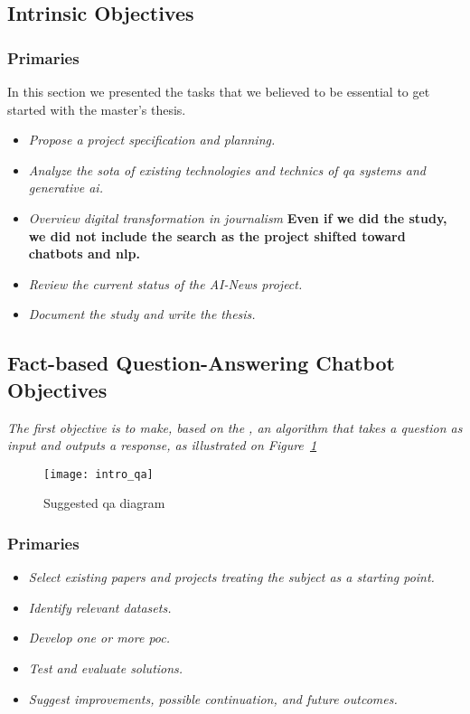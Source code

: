 \subsection{Intrinsic Objectives}
\subsubsection{Primaries}
In this section we presented the tasks that we believed to be essential to get started with the master's thesis. 

\begin{itemize}[noitemsep]
    \item[\checkmark] \textit{Propose a project specification and planning.} %
    \item[\checkmark] \textit{Analyze the \gls{sota} of existing technologies and technics of \gls{qa} systems and \gls{generative} \gls{ai}.}
    \item[\checkmark] \textit{Overview digital transformation in journalism} \textbf{Even if we did the study, we did not include the search as the project shifted toward chatbots and \gls{nlp}.}
    \item[\checkmark] \textit{Review the current status of the AI-News project.}
    \item[\checkmark] \textit{Document the study and write the thesis.}
\end{itemize}


\subsection{Fact-based Question-Answering Chatbot Objectives}
\textit{The first objective is to make, based on the , an algorithm that takes a question as input and outputs a response, as illustrated on Figure~\ref{fig:management_qa}}

\begin{figure}
    \centering
    \texttt{[image: intro\_qa]}
    \caption{Suggested \gls{qa} diagram}
    \label{fig:management_qa}
\end{figure}

\subsubsection{Primaries}
\begin{itemize}[noitemsep]
    \item[\checkmark] \textit{Select existing papers and projects treating the subject as a starting point.}
    \item[\checkmark] \textit{Identify relevant datasets.}
    \item[\checkmark] \textit{Develop one or more \gls{poc}.}
    \item[\checkmark] \textit{Test and evaluate solutions.}
    \item[\checkmark] \textit{Suggest improvements, possible continuation, and future outcomes.}
\end{itemize}

